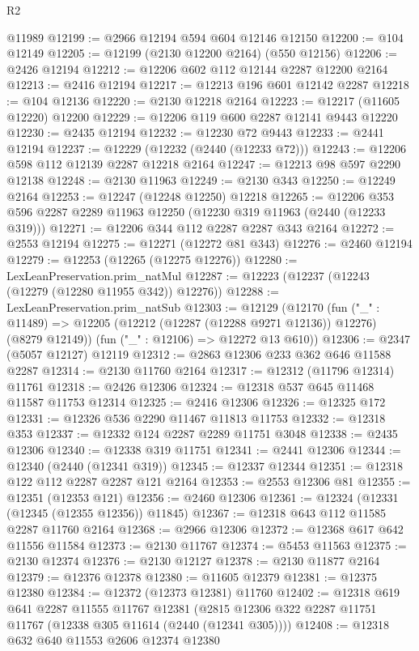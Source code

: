 \begin{lexlean}{R2}
\begin{coremodule}
    @11989
@12199 := @2966 @12194 @594 @604 @12146 @12150
@12200 := @104 @12149
@12205 := @12199 (@2130 @12200 @2164) (@550 @12156)
@12206 := @2426 @12194
@12212 := @12206 @602 @112 @12144 @2287 @12200 @2164
@12213 := @2416 @12194
@12217 := @12213 @196 @601 @12142 @2287
@12218 := @104 @12136
@12220 := @2130 @12218 @2164
@12223 := @12217 (@11605 @12220) @12200
@12229 := @12206 @119 @600 @2287 @12141 @9443 @12220
@12230 := @2435 @12194
@12232 := @12230 @72 @9443
@12233 := @2441 @12194
@12237 := @12229 (@12232 (@2440 (@12233 @72)))
@12243 := @12206 @598 @112 @12139 @2287 @12218 @2164
@12247 := @12213 @98 @597 @2290 @12138
@12248 := @2130 @11963
@12249 := @2130 @343
@12250 := @12249 @2164
@12253 := @12247 (@12248 @12250) @12218
@12265 := @12206 @353 @596 @2287 @2289 @11963 @12250 (@12230 @319 @11963 (@2440 (@12233 @319)))
@12271 := @12206 @344 @112 @2287 @2287 @343 @2164
@12272 := @2553 @12194
@12275 := @12271 (@12272 @81 @343)
@12276 := @2460 @12194
@12279 := @12253 (@12265 (@12275 @12276))
@12280 := LexLeanPreservation.prim_natMul
@12287 := @12223 (@12237 (@12243 (@12279 (@12280 @11955 @342)) @12276))
@12288 := LexLeanPreservation.prim_natSub
@12303 := @12129
    (@12170
      (fun ("_" : @11489) => @12205 (@12212 (@12287 (@12288 @9271 @12136)) @12276) (@8279 @12149))
      (fun ("_" : @12106) => @12272 @13 @610))
@12306 := @2347 (@5057 @12127) @12119
@12312 := @2863 @12306 @233 @362 @646 @11588 @2287
@12314 := @2130 @11760 @2164
@12317 := @12312 (@11796 @12314) @11761
@12318 := @2426 @12306
@12324 := @12318 @537 @645 @11468 @11587 @11753 @12314
@12325 := @2416 @12306
@12326 := @12325 @172
@12331 := @12326 @536 @2290 @11467 @11813 @11753
@12332 := @12318 @353
@12337 := @12332 @124 @2287 @2289 @11751 @3048
@12338 := @2435 @12306
@12340 := @12338 @319 @11751
@12341 := @2441 @12306
@12344 := @12340 (@2440 (@12341 @319))
@12345 := @12337 @12344
@12351 := @12318 @122 @112 @2287 @2287 @121 @2164
@12353 := @2553 @12306 @81
@12355 := @12351 (@12353 @121)
@12356 := @2460 @12306
@12361 := @12324 (@12331 (@12345 (@12355 @12356)) @11845)
@12367 := @12318 @643 @112 @11585 @2287 @11760 @2164
@12368 := @2966 @12306
@12372 := @12368 @617 @642 @11556 @11584
@12373 := @2130 @11767
@12374 := @5453 @11563
@12375 := @2130 @12374
@12376 := @2130 @12127
@12378 := @2130 @11877 @2164
@12379 := @12376 @12378
@12380 := @11605 @12379
@12381 := @12375 @12380
@12384 := @12372 (@12373 @12381) @11760
@12402 := @12318
    @619
    @641
    @2287
    @11555
    @11767
    @12381
    (@2815 @12306 @322 @2287 @11751 @11767 (@12338 @305 @11614 (@2440 (@12341 @305))))
@12408 := @12318 @632 @640 @11553 @2606 @12374 @12380

\end{coremodule}
\end{lexlean}
